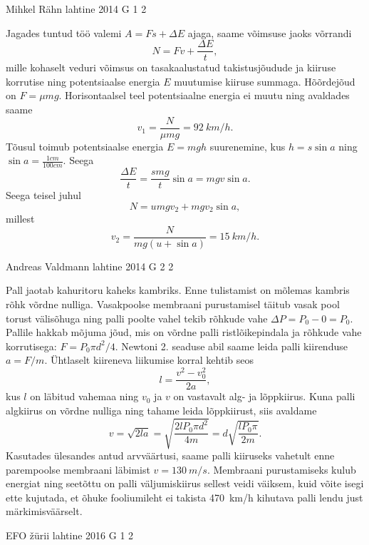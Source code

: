 \documentclass[11pt, twoside]{article}
\begin{document}
{%
{Mihkel Rähn} %
{lahtine} %
{2014} %
{G 1} %
{2} %
{

\ifSolution
Jagades tuntud töö valemi $A=Fs+\Delta E$ ajaga, saame võimsuse jaoks võrrandi 
\[
N=Fv+\frac{\Delta E}{t},
\]
mille kohaselt veduri võimsus on tasakaalustatud takistusjõudude ja kiiruse korrutise ning potentsiaalse energia $E$ muutumise kiiruse summaga. Hõõrdejõud on $F=\mu mg$. Horisontaalsel teel potentsiaalne energia ei muutu ning avaldades saame
\[
v_1=\frac{N}{\mu mg}=\SI{92}{km \per h}.
\]
Tõusul toimub potentsiaalse energia $E=mgh$ suurenemine, kus $h=s\sin a$ ning $\sin a=\frac{1cm}{100cm}$. Seega
\[
\frac{\Delta E}{t}=\frac{smg}{t}\sin a=mgv\sin a.
\]
Seega teisel juhul
\[
N=umgv_2+mgv_2\sin a,
\]
millest
\[
v_2=\frac{N}{mg(u+\sin a)}=\SI{15}{km \per h}.
\]
\fi
}

{Andreas Valdmann} %
{lahtine} %
{2014} %
{G 2} %
{2} %
{

\ifSolution
Pall jaotab kahuritoru kaheks kambriks. Enne tulistamist on mõlemas kambris rõhk võrdne nulliga. Vasakpoolse membraani purustamisel täitub vasak pool torust välisõhuga ning palli poolte vahel tekib rõhkude vahe $\Delta P=P_0-0=P_0$. Pallile hakkab mõjuma jõud, mis on võrdne palli ristlõikepindala ja rõhkude vahe korrutisega: $F=P_0\pi d^2/4$. Newtoni 2. seaduse abil saame leida palli kiirenduse $a=F/m$. Ühtlaselt kiireneva liikumise korral kehtib seos
\[ l=\frac{v^2-v_0^2}{2a}, \]
kus $l$ on läbitud vahemaa ning $v_0$ ja $v$ on vastavalt alg- ja lõppkiirus. Kuna palli algkiirus on võrdne nulliga ning tahame leida lõppkiirust, siis avaldame
\[ v=\sqrt{2la}=\sqrt{\frac{2lP_0\pi d^2}{4m}}=d\sqrt{\frac{lP_0\pi}{2m}}.\]
Kasutades ülesandes antud arvväärtusi, saame palli kiiruseks vahetult enne parempoolse membraani läbimist $v=\SI{130}{m/s}$. Membraani purustamiseks kulub energiat ning seetõttu on palli väljumiskiirus sellest veidi väiksem, kuid võite isegi ette kujutada, et õhuke fooliumileht ei takista \SI{470}{km/h} kihutava palli lendu just märkimisväärselt.
\fi
}

{EFO žürii} %
{lahtine} %
{2016} %
{G 1} %
{2} %
{

}}
\end{document}
